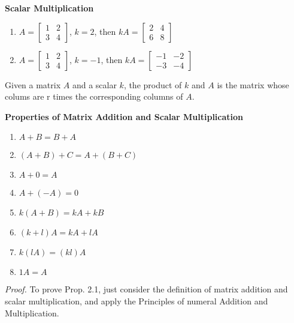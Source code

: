 \documentclass[10pt, a4paper]{article}
\begin{document}
\begin{example}
    \textbf{Scalar Multiplication}
    \begin{enumerate}
        \item $A = \begin{bmatrix} 1 & 2 \\ 3 & 4 \end{bmatrix}$, $k = 2$, then $kA = \begin{bmatrix} 2 & 4 \\ 6 & 8 \end{bmatrix}$
        \item $A = \begin{bmatrix} 1 & 2 \\ 3 & 4 \end{bmatrix}$, $k = -1$, then $kA = \begin{bmatrix} -1 & -2 \\ -3 & -4 \end{bmatrix}$
    \end{enumerate}
\end{example}
Given a matrix $A$ and a scalar $k$, the product of $k$ and $A$ is the matrix whose colums are r times the corresponding columns of $A$.
\begin{proposition}
    \textbf{Properties of Matrix Addition and Scalar Multiplication}
    \begin{enumerate}
        \item $A + B = B + A$
        \item $(A + B) + C = A + (B + C)$
        \item $A + 0 = A$
        \item $A + (-A) = 0$
        \item $k(A + B) = kA + kB$
        \item $(k + l)A = kA + lA$
        \item $k(lA) = (kl)A$
        \item $1A = A$
    \end{enumerate}
\end{proposition}
\textit{Proof.} To prove Prop. 2.1, just consider the definition of matrix addition and scalar multiplication, and apply the Principles of numeral Addition and Multiplication.
\end{document}
